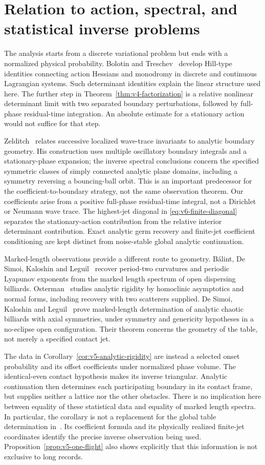 \section{Relation to action, spectral, and statistical inverse problems}
\label{sec:v5-comparison}
The analysis starts from a discrete variational problem but ends with a
normalized physical probability. Bolotin and Treschev~\cite{Hill} develop
Hill-type identities connecting action Hessians and monodromy in discrete
and continuous Lagrangian systems. Such determinant identities explain
the linear structure used here. The further step in
Theorem~\ref{thm:v4-factorization} is a relative nonlinear determinant
limit with two separated boundary perturbations, followed by full-phase
residual-time integration. An absolute estimate for a stationary action
would not suffice for that step.

Zelditch~\cite{Zelditch} relates successive localized wave-trace
invariants to analytic boundary geometry. His construction uses
multiple oscillatory boundary integrals and a stationary-phase expansion;
the inverse spectral conclusions concern the specified symmetric classes
of simply connected analytic plane domains, including a symmetry
reversing a bouncing-ball orbit. This is an important predecessor for
the coefficient-to-boundary strategy, not the same observation theorem.
Our coefficients arise from a positive full-phase residual-time integral,
not a Dirichlet or Neumann wave trace. The highest-jet diagonal in
\eqref{eq:v6-finite-diagonal} separates the stationary-action contribution
from the relative interior determinant contribution. Exact analytic germ
recovery and finite-jet coefficient conditioning are kept distinct from
noise-stable global analytic continuation.

Marked-length observations provide a different route to geometry.
B\'alint, De Simoi, Kaloshin and Leguil~\cite{BDKL} recover period-two
curvatures and periodic Lyapunov exponents from the marked length
spectrum of open dispersing billiards. Osterman~\cite{Osterman} studies
analytic rigidity by homoclinic asymptotics and normal forms, including
recovery with two scatterers supplied. De Simoi, Kaloshin and
Leguil~\cite{DSKL} prove marked-length determination of analytic chaotic
billiards with axial symmetries, under symmetry and genericity hypotheses
in a no-eclipse open configuration. Their theorem concerns the geometry
of the table, not merely a specified contact jet.

The data in Corollary~\ref{cor:v5-analytic-rigidity} are instead a selected
onset probability and its offset coefficients under normalized phase
volume. The identical-even contact hypothesis makes its inverse
triangular. Analytic continuation then determines each participating
boundary in its contact frame, but supplies neither a lattice nor the
other obstacles. There is no implication here between equality of these
statistical data and equality of marked length spectra. In particular,
the corollary is not a replacement for the global table determination
in~\cite{DSKL}. Its coefficient formula and its physically realized
finite-jet coordinates identify the precise inverse observation being
used. Proposition~\ref{prop:v5-one-flight} also shows explicitly that
this information is not exclusive to long records.

